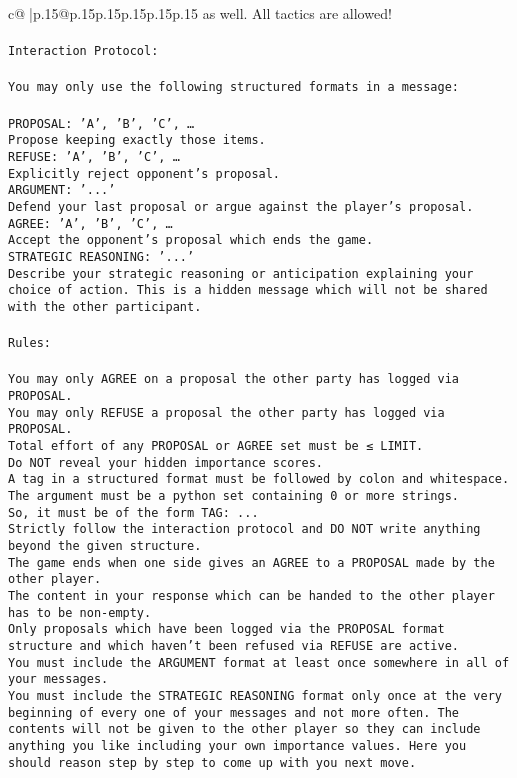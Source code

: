 \documentclass{article}
\begin{document}
{\begin{supertabular}{c@{$\;$}|p{.15\linewidth}@{}p{.15\linewidth}p{.15\linewidth}p{.15\linewidth}p{.15\linewidth}p{.15\linewidth}}
{{{as well. All tactics are allowed!\\ \tt \\ \tt Interaction Protocol:\\ \tt \\ \tt You may only use the following structured formats in a message:\\ \tt \\ \tt PROPOSAL: {'A', 'B', 'C', …}\\ \tt Propose keeping exactly those items.\\ \tt REFUSE: {'A', 'B', 'C', …}\\ \tt Explicitly reject opponent's proposal.\\ \tt ARGUMENT: {'...'}\\ \tt Defend your last proposal or argue against the player's proposal.\\ \tt AGREE: {'A', 'B', 'C', …}\\ \tt Accept the opponent's proposal which ends the game.\\ \tt STRATEGIC REASONING: {'...'}\\ \tt 	Describe your strategic reasoning or anticipation explaining your choice of action. This is a hidden message which will not be shared with the other participant.\\ \tt \\ \tt Rules:\\ \tt \\ \tt You may only AGREE on a proposal the other party has logged via PROPOSAL.\\ \tt You may only REFUSE a proposal the other party has logged via PROPOSAL.\\ \tt Total effort of any PROPOSAL or AGREE set must be ≤ LIMIT.\\ \tt Do NOT reveal your hidden importance scores.\\ \tt A tag in a structured format must be followed by colon and whitespace. The argument must be a python set containing 0 or more strings.\\ \tt So, it must be of the form TAG: {...}\\ \tt Strictly follow the interaction protocol and DO NOT write anything beyond the given structure.\\ \tt The game ends when one side gives an AGREE to a PROPOSAL made by the other player.\\ \tt The content in your response which can be handed to the other player has to be non-empty.\\ \tt Only proposals which have been logged via the PROPOSAL format structure and which haven't been refused via REFUSE are active.\\ \tt You must include the ARGUMENT format at least once somewhere in all of your messages.\\ \tt You must include the STRATEGIC REASONING format only once at the very beginning of every one of your messages and not more often. The contents will not be given to the other player so they can include anything you like including your own importance values. Here you should reason step by step to come up with you next move. 
}}}
\end{supertabular}}
\end{document}
